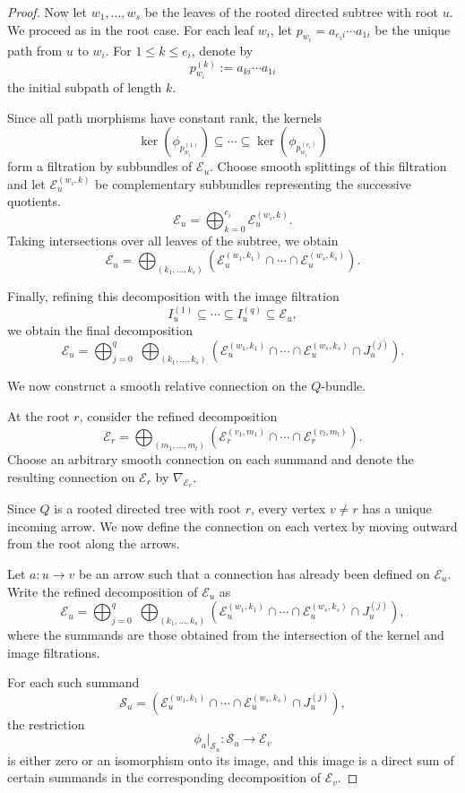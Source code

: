 \documentclass[12pt, reqno]{amsart}
\theoremstyle{plain}
\numberwithin{equation}{section}
\begin{document}
\begin{proof}
Now let $w_1, \dots, w_s$ be the leaves of the rooted directed subtree with root $u$. We proceed as in the root case. For each leaf $w_i$, let
$p_{w_i} = a_{e_i i} \cdots a_{1 i}$
be the unique path from $u$ to $w_i$. 
For $1 \le k \le e_i$, denote by
\[
p_{w_i}^{(k)} := a_{k i} \cdots a_{1 i}
\]
the initial subpath of length $k$.

Since all path morphisms have constant rank, the kernels
\[
\ker(\phi_{p_{w_i}^{(1)}})
\subseteq
\cdots
\subseteq
\ker(\phi_{p_{w_i}^{(e_i)}})
\]
form a filtration by subbundles of $\mathcal{E}_u$. Choose smooth splittings of this filtration and let 
$\mathcal{E}_u^{(w_i,k)}$ be complementary subbundles representing the successive quotients.
\[
\mathcal{E}_u
=
\bigoplus_{k=0}^{e_i}
\mathcal{E}_u^{(w_i,k)}.
\]
Taking intersections over all leaves of the subtree, we obtain
\[
\mathcal{E}_u
=
\bigoplus_{(k_1,\dots,k_s)}
\left(
\mathcal{E}_u^{(w_1,k_1)}
\cap
\cdots
\cap
\mathcal{E}_u^{(w_s,k_s)}
\right).
\]

Finally, refining this decomposition with the image filtration
\[
I_u^{(1)} \subseteq \cdots \subseteq I_u^{(q)} \subseteq \mathcal{E}_u,
\]
we obtain the final decomposition
\[
\mathcal{E}_u
=
\bigoplus_{j=0}^{q}
\;
\bigoplus_{(k_1,\dots,k_s)}
\left(
\mathcal{E}_u^{(w_1,k_1)}
\cap
\cdots
\cap
\mathcal{E}_u^{(w_s,k_s)}
\cap
J_u^{(j)}
\right).
\]


We now construct a smooth relative connection on the $Q$-bundle.

At the root $r$, consider the refined decomposition
\[
\mathcal{E}_r
=
\bigoplus_{(m_1,\dots,m_l)}
\left(
\mathcal{E}_r^{(v_1,m_1)}
\cap
\cdots
\cap
\mathcal{E}_r^{(v_l,m_l)}
\right).
\]
Choose an arbitrary smooth connection on each summand and denote the
resulting connection on $\mathcal{E}_r$ by $\nabla_{\mathcal{E}_r}$.

Since $Q$ is a rooted directed tree with root $r$, every vertex $v \neq r$ has a unique
incoming arrow. We now define the connection on each vertex by
moving outward from the root along the arrows.

Let $a : u \to v$ be an arrow such that a connection has already
been defined on $\mathcal{E}_u$. Write the refined decomposition of $\mathcal{E}_u$ as
\[
\mathcal{E}_u
=
\bigoplus_{j=0}^{q}
\;
\bigoplus_{(k_1,\dots,k_s)}
\left(
\mathcal{E}_u^{(w_1,k_1)}
\cap
\cdots
\cap
\mathcal{E}_u^{(w_s,k_s)}
\cap
J_u^{(j)}
\right),
\]
where the summands are those obtained from the intersection of
the kernel and image filtrations.

For each such summand
\[
\mathcal{S}_u
=
\left(
\mathcal{E}_u^{(w_1,k_1)}
\cap
\cdots
\cap
\mathcal{E}_u^{(w_s,k_s)}
\cap
J_u^{(j)}
\right),
\]
the restriction
\[
\phi_a\big|_{\mathcal{S}_u}
:
\mathcal{S}_u
\longrightarrow
\mathcal{E}_v
\]
is either zero or an isomorphism onto its image, and this image
is a direct sum of certain summands in the corresponding
decomposition of $\mathcal{E}_v$.


\end{proof}
\end{document}
